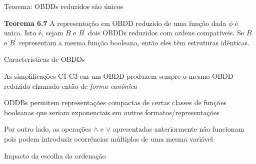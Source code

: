 \expandafter\documentclass\expandafter[table, usenames, svgnames, dvipsnames,14pt, \classopts]{beamer}
\begin{document}
\begin{frame}{Teorema: \uppercase{OBDD}s reduzidos são únicos}

    \begin{block}{\textbf{Teorema 6.7}}
        A representação em OBDD reduzido de uma função dada $\phi$ é unica. Isto é, sejam $B$ e $B^\prime$ dois OBDDs reduzidos com ordens compatíveis. Se $B$ e $B^\prime$ representam a mesma função booleana, então eles têm estruturas idênticas.
    \end{block}

\end{frame}

\begin{frame}{Características de \uppercase{OBDD}s}

    \begin{outline}
        \1 As simplificações C1-C3 em um OBDD produzem sempre o mesmo OBDD reduzido
            \2[-] chamado então de \textit{forma canônica}
        
        \vspace{1em}
        
        \1 ODDBs permitem representações compactas de certas classes de funções booleanas
            \2[-] que seriam exponenciais em outros formatos/representações
            
        \vspace{1em}
        
        \1 Por outro lado, as operações $\land$ e $\lor$ apresentadas anteriormente não funcionam
            \2[-] pois podem introduzir ocorrências múltiplas de uma mesma variável
    \end{outline}

\end{frame}

\begin{frame}{Impacto da escolha da ordenação}


\end{frame}
\end{document}
